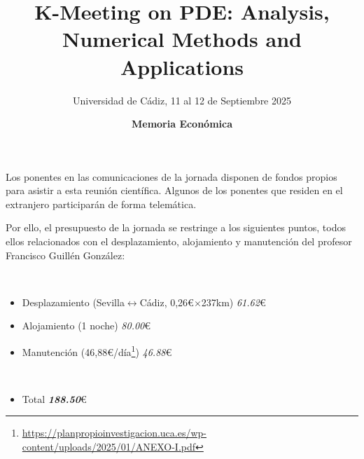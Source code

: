 \documentclass[12pt,a4paper]{article}
\title{K-Meeting on PDE: Analysis, Numerical Methods and Applications}
\date{\bf Memoria Económica}
\author{Universidad de Cádiz, {11 al 12 de Septiembre 2025}}
\begin{document}
\maketitle

Los ponentes en las comunicaciones de la jornada disponen de fondos propios para asistir a esta reunión científica. Algunos de los ponentes que residen en el extranjero participarán de forma telemática.

Por ello, el presupuesto de la jornada se restringe a los siguientes puntos, todos ellos relacionados con el desplazamiento, alojamiento y manutención del profesor Francisco Guillén González:

\par ~\smallskip~

\begin{itemize}
	\item
	      Desplazamiento (Sevilla$\leftrightarrow$Cádiz, 0,26€$\times$237km) \dotfill \textit{61.62}€
	\item
	      Alojamiento (1 noche) \dotfill \textit{80.00}€
	\item
	      Manutención (46,88€/día\footnote{\url{https://planpropioinvestigacion.uca.es/wp-content/uploads/2025/01/ANEXO-I.pdf}}) \dotfill \textit{46.88}€
	      \par ~\smallskip~
	\item
	      Total \dotfill \textbf{\textit{188.50}}€
\end{itemize}
\end{document}
